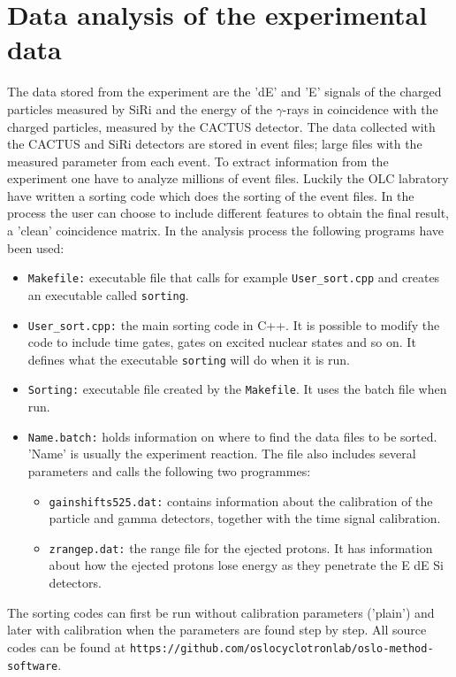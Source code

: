 \documentclass[11pt,a4wide]{article}
\begin{document}
\section{Data analysis of the experimental data}
The data stored from the experiment are the 'dE' and 'E' signals of the charged particles measured by SiRi and the energy of the $\gamma$-rays in coincidence with the charged particles, measured by the CACTUS detector. The data collected with the CACTUS and SiRi detectors are stored in event files; large files with the measured parameter from each event. To extract information from the experiment one have to analyze millions of event files. Luckily the OLC labratory have written a sorting code which does the sorting of the event files. In the process the user can choose to include different features to obtain the final result, a 'clean' coincidence matrix. In the analysis process the following programs have been used:
\begin{itemize}
\item \texttt{Makefile:} executable file that calls for example \texttt{User\_sort.cpp} and creates an executable called \texttt{sorting}.
\item \texttt{User\_sort.cpp:} the main sorting code in C++. It is possible to modify the code to include time gates, gates on excited nuclear states and so on. It defines what the executable \texttt{sorting} will do when it is run. 
\item \texttt{Sorting:} executable file created by the \texttt{Makefile}. It uses the batch file when run.
\item \texttt{Name.batch:} holds information on where to find the data files to be sorted. 'Name' is usually the experiment reaction. The file also includes several parameters and calls the following two programmes:
\begin{itemize}
\item \texttt{gainshifts525.dat:} contains information about the calibration of the particle and gamma detectors, together with the time signal calibration.
\item \texttt{zrangep.dat:} the range file for the ejected protons. It has information about how the ejected protons lose energy as they penetrate the E dE Si detectors.
\end{itemize}
\end{itemize}
The sorting codes can first be run without calibration parameters ('plain') and later with calibration when the parameters are found step by step. All source codes can be found at \texttt{https://github.com/oslocyclotronlab/oslo-method-software}.
\end{document}
